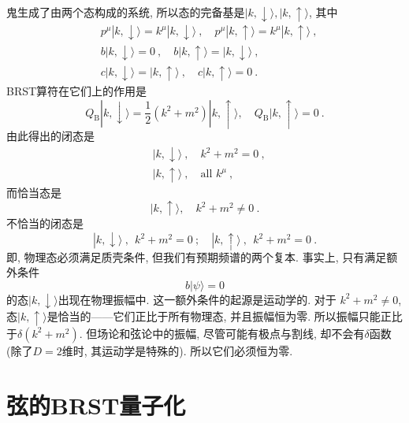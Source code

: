鬼生成了由两个态构成的系统, 所以态的完备基是$|k, \downarrow\rangle,|k, \uparrow\rangle$, 其中
\begin{subequations} \label{4.2.28}
\begin{align}
&p^{\mu}|k, \downarrow\rangle=k^{\mu}|k, \downarrow\rangle\:, \quad p^{\mu}|k, \uparrow\rangle=k^{\mu}|k, \uparrow\rangle \:, \label{4.2.28a}\\
&b|k, \downarrow\rangle=0\:, \quad b|k, \uparrow\rangle=|k, \downarrow\rangle \:, \label{4.2.28b}\\
&c|k, \downarrow\rangle=|k, \uparrow\rangle \:, \quad c|k, \uparrow\rangle=0 \:.  \label{4.2.28c}
\end{align}
\end{subequations}
BRST算符在它们上的作用是
\begin{equation}
Q_{\mathrm{B}}|k, \downarrow\rangle=\frac{1}{2}(k^{2}+m^{2})|k, \uparrow\rangle, \quad Q_{\mathrm{B}}|k, \uparrow\rangle=0 \:. \label{4.2.29}
\end{equation}
由此得出的闭态是
\begin{subequations} \label{4.2.30}
\begin{align}
&|k, \downarrow\rangle \:, \quad k^{2}+m^{2}=0  \:, \label{4.2.30a} \\
&|k, \uparrow\rangle \:, \quad \text {all } k^{\mu} \:, \label{4.2.30b}
\end{align}
\end{subequations}
而恰当态是
\begin{equation}
|k, \uparrow\rangle, \quad k^{2}+m^{2} \neq 0 \:. \label{4.2.31}
\end{equation}
不恰当的闭态是
\begin{equation}
|k, \downarrow\rangle\:,\:\: k^{2}+m^{2}=0 \: ; \quad|k, \uparrow\rangle\:,\:\: k^{2}+m^{2}=0 \:. \label{4.2.32}
\end{equation}
即, 物理态必须满足质壳条件, 但我们有预期频谱的两个复本. 事实上, 只有满足额外条件
\begin{equation}
b|\psi\rangle=0  \label{4.2.33}
\end{equation}
的态$|k, \downarrow\rangle$出现在物理振幅中. 这一额外条件的起源是运动学的. 对于 $k^{2}+m^{2} \neq 0$, 态$|k, \uparrow\rangle$是恰当的——它们正比于所有物理态, 并且振幅恒为零. 所以振幅只能正比于$\delta(k^{2}+m^{2})$. 但场论和弦论中的振幅, 尽管可能有极点与割线, 却不会有$\delta$函数(除了$D=2$维时, 其运动学是特殊的). 所以它们必须恒为零.


\newpage 

\section{\texorpdfstring{弦的BRST量子化}{4.3 BRST quantization of the string}} \label{sec:4.3}

